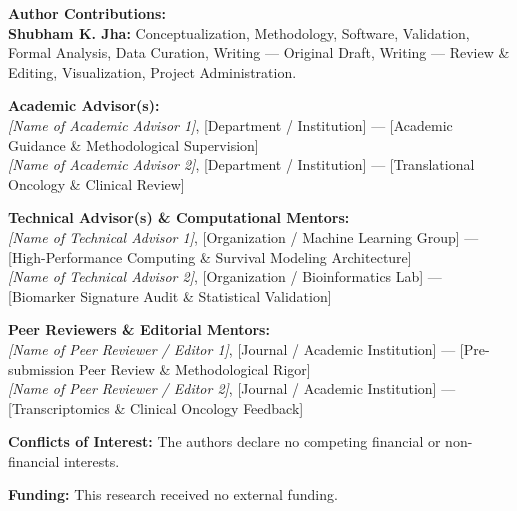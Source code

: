 \documentclass[10pt,a4paper,twocolumn]{article}
\begin{document}
\noindent\textbf{Author Contributions:} \\
\textbf{Shubham K. Jha:} Conceptualization, Methodology, Software, Validation, Formal Analysis, Data Curation, Writing --- Original Draft, Writing --- Review \& Editing, Visualization, Project Administration.

\vspace{0.5em}
\noindent\textbf{Academic Advisor(s):} \\
\textit{[Name of Academic Advisor 1]}, [Department / Institution] --- [Academic Guidance \& Methodological Supervision] \\
\textit{[Name of Academic Advisor 2]}, [Department / Institution] --- [Translational Oncology \& Clinical Review]

\vspace{0.5em}
\noindent\textbf{Technical Advisor(s) \& Computational Mentors:} \\
\textit{[Name of Technical Advisor 1]}, [Organization / Machine Learning Group] --- [High-Performance Computing \& Survival Modeling Architecture] \\
\textit{[Name of Technical Advisor 2]}, [Organization / Bioinformatics Lab] --- [Biomarker Signature Audit \& Statistical Validation]

\vspace{0.5em}
\noindent\textbf{Peer Reviewers \& Editorial Mentors:} \\
\textit{[Name of Peer Reviewer / Editor 1]}, [Journal / Academic Institution] --- [Pre-submission Peer Review \& Methodological Rigor] \\
\textit{[Name of Peer Reviewer / Editor 2]}, [Journal / Academic Institution] --- [Transcriptomics \& Clinical Oncology Feedback]

\vspace{0.5em}
\noindent\textbf{Conflicts of Interest:} The authors declare no competing financial or non-financial interests.

\vspace{0.5em}
\noindent\textbf{Funding:} This research received no external funding.
\end{document}
